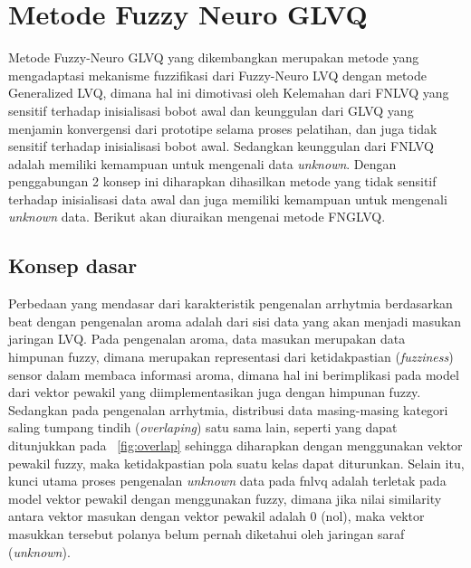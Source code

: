 \section{Metode Fuzzy Neuro GLVQ}
Metode Fuzzy-Neuro GLVQ yang dikembangkan merupakan metode yang
mengadaptasi mekanisme fuzzifikasi dari Fuzzy-Neuro LVQ dengan metode
Generalized LVQ, dimana hal ini dimotivasi oleh Kelemahan dari FNLVQ yang sensitif terhadap
inisialisasi bobot awal dan keunggulan dari GLVQ yang menjamin konvergensi dari
prototipe selama proses pelatihan, dan juga tidak sensitif terhadap inisialisasi
bobot awal. Sedangkan keunggulan dari FNLVQ adalah memiliki kemampuan untuk
mengenali data \emph{unknown}.  Dengan penggabungan 2 konsep ini diharapkan
dihasilkan metode yang tidak sensitif terhadap inisialisasi data awal dan juga
memiliki kemampuan untuk mengenali \emph{unknown} data. Berikut akan diuraikan
mengenai metode FNGLVQ.

\subsection{Konsep dasar}
Perbedaan yang mendasar dari karakteristik pengenalan arrhytmia berdasarkan beat
dengan pengenalan aroma adalah dari sisi data yang akan menjadi masukan
jaringan LVQ. Pada pengenalan aroma, data masukan merupakan data himpunan
fuzzy, dimana merupakan representasi dari ketidakpastian (\emph{fuzziness})
sensor dalam membaca informasi aroma, dimana hal ini berimplikasi pada model
dari vektor pewakil yang diimplementasikan juga dengan himpunan fuzzy. Sedangkan
pada pengenalan arrhytmia, distribusi data masing-masing kategori saling tumpang
tindih (\emph{overlaping}) satu sama lain, seperti yang dapat ditunjukkan pada
\pic~\ref{fig:overlap} sehingga diharapkan dengan menggunakan vektor pewakil
fuzzy, maka ketidakpastian pola suatu kelas dapat diturunkan. Selain itu, kunci
utama proses pengenalan \emph{unknown} data pada \gls{fnlvq} adalah terletak
pada model vektor pewakil dengan menggunakan fuzzy, dimana jika nilai
similarity antara vektor masukan dengan vektor pewakil adalah 0 (nol), maka
vektor masukkan tersebut polanya belum pernah diketahui oleh jaringan saraf
(\emph{unknown}).


